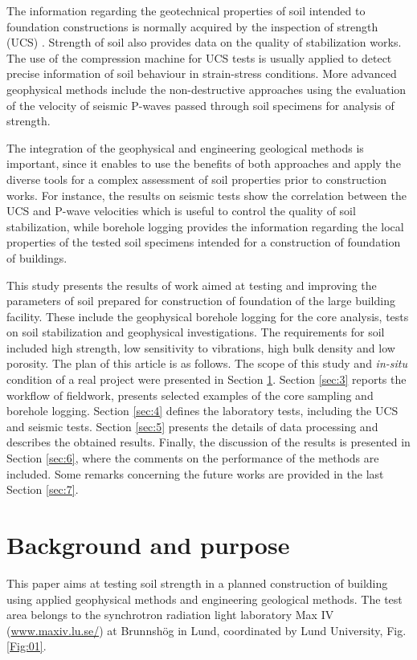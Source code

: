 \documentclass[USenglish,twocolumn]{article}
\begin{document}
The information regarding the geotechnical properties of soil intended to foundation constructions is normally acquired by the inspection of strength (UCS) \cite{LindhWinter,LindhLemenkova_SJCE,LindhLemenkova_CEE}. Strength of soil also provides data on the quality of stabilization works. The use of the compression machine for UCS tests is usually applied to detect precise information of soil behaviour in strain-stress conditions. More advanced geophysical methods include the non-destructive approaches using the evaluation of the velocity of seismic P-waves passed through soil specimens for analysis of strength. 

The integration of the geophysical and engineering geological methods is important, since it enables to use the benefits of both approaches and apply the diverse tools for a complex assessment of soil properties prior to construction works. For instance, the results on seismic tests show the correlation between the UCS and P-wave velocities which is useful to control the quality of soil stabilization, while borehole logging provides the information regarding the local properties of the tested soil specimens intended for a construction of foundation of buildings.

This study presents the results of work aimed at testing and improving the parameters of soil prepared for construction of foundation of the large building facility. These include the geophysical borehole logging for the core analysis, tests on soil stabilization and geophysical investigations. The requirements for soil included high strength, low sensitivity to vibrations, high bulk density and low porosity. The plan of this article is as follows. The scope of this study and \emph{in-situ} condition of a real project were presented in Section \ref{sec:2}. Section \ref{sec:3} reports the workflow of fieldwork, presents selected examples of the core sampling and borehole logging. Section \ref{sec:4} defines the laboratory tests, including the UCS and seismic tests. Section \ref{sec:5} presents the details of data processing and describes the obtained results. Finally, the discussion of the results is presented in Section \ref{sec:6}, where the comments on the performance of the methods are included. Some remarks concerning the future works are provided in the last Section \ref{sec:7}.

\section{Background and purpose}\label{sec:2}
This paper aims at testing soil strength in a planned construction of building using applied geophysical methods and engineering geological methods. The test area belongs to the synchrotron radiation light laboratory Max IV (\href{https://www.maxiv.lu.se/}{www.maxiv.lu.se/}) at Brunnsh\"og in Lund, coordinated by Lund University, Fig. \ref{Fig:01}. 
\end{document}
